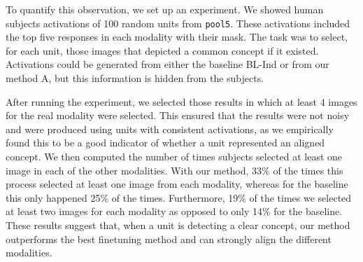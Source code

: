 \documentclass[10pt,journal,compsoc]{IEEEtran}
\begin{document}
	To quantify this observation, we set up an experiment. We showed human subjects activations of 100 random units from \texttt{pool5}. These activations included the top five responses in each modality with their mask. The task was to select, for each unit, those images that depicted a common concept if it existed. Activations could be generated from either the baseline BL-Ind or from our method A, but this information is hidden from the subjects. 
	
	After running the experiment, we selected those results in which at least 4 images for the real modality were selected. This ensured that the results were not noisy and were produced using units with consistent activations, as we empirically found this to be a good indicator of whether a unit represented an aligned concept. We then computed the number of times subjects selected at least one image in each of the other modalities. With our method, 33\% of the times this process selected at least one image from each modality, whereas for the baseline this only happened 25\% of the times. Furthermore, 19\% of the times we selected at least two images for each modality as opposed to only 14\% for the baseline.  These results suggest that, when a unit is detecting a clear concept, our method outperforms the best finetuning method and can strongly align the different modalities.
	
\end{document}
